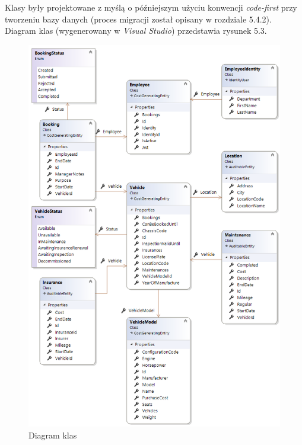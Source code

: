 \documentclass[eng,printmode,openany]{mgr}
\begin{document}
	
	
	\newpage	
	
	
	Klasy były projektowane z myślą o późniejszym użyciu konwencji \textit{code-first} przy tworzeniu bazy danych (proces migracji został opisany w rozdziale 5.4.2). Diagram klas (wygenerowany w \textit{Visual Studio}) przedstawia rysunek 5.3.
	\newpage
	\begin{figure}[H]
		\centering
		\includegraphics[width=\textwidth]{images/vs_class_diagram.png}
		\caption{Diagram klas}
		\small
		
	\end{figure}
	
\end{document}
